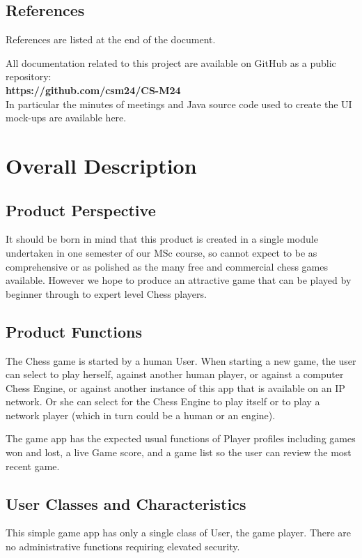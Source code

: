 \documentclass[a4paper,10pt]{article}
\begin{document}
\subsection{References}
References are listed at the end of the document.

All documentation related to this project are available on GitHub as a public repository:\\
\textbf{https://github.com/csm24/CS-M24}\\
In particular the minutes of meetings and Java source code used to create the UI mock-ups are available here. 

\section{Overall Description}
\subsection{Product Perspective}
It should be born in mind that this product is created in a single module undertaken in one semester of our MSc course, so cannot expect to be as comprehensive or as polished as the many free and commercial chess games available. However we hope to produce an attractive game that can be played by beginner through to expert level Chess players.

\subsection{Product Functions}

The Chess game is started by a human User. When starting a new game, the user can select to play herself, against another human player, or against a computer Chess Engine, or against another instance of this app that is available on an IP network. Or she can select for the Chess Engine to play itself or to play a network player (which in turn could be a human or an engine). 

The game app has the expected usual functions of Player profiles including games won and lost, a live Game score, and a game list so the user can review the most recent game. 

\subsection{User Classes and Characteristics}
This simple game app has only a single class of User, the game player. There are no administrative functions requiring elevated security. 
\end{document}
